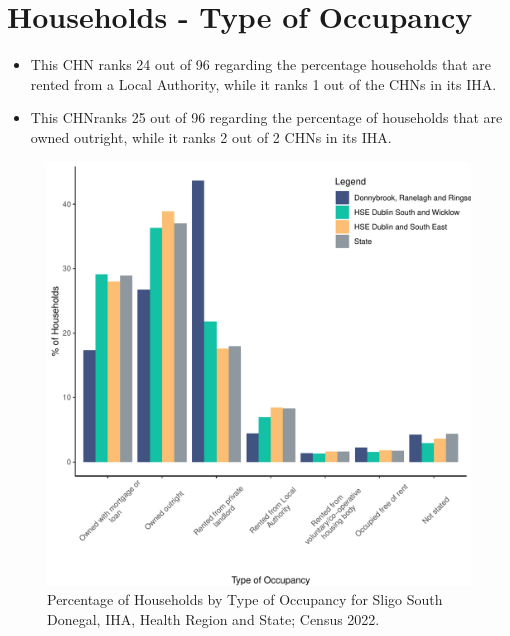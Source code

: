 \documentclass{article}
\begin{document}
\section{Households - Type of Occupancy}\label{sect:Households}
\begin{itemize}
\item This CHN ranks  24 out of 96 regarding the percentage households that are rented from a Local Authority, while it ranks  1 out of the CHNs in its IHA. 
\item This CHNranks  25 out of 96 regarding the percentage of households that are owned outright, while it ranks   2 out of 2 CHNs in its IHA.
\end{itemize}
\begin{figure}[H]
	\centering
	\includegraphics[width = 140mm]{../figures/HouseholdsED.pdf}
	\caption{Percentage of Households by Type of Occupancy for Sligo South Donegal, IHA, Health Region and State; Census 2022.}
	\label{fig:vbnv}
	\end{figure}
\end{document}
